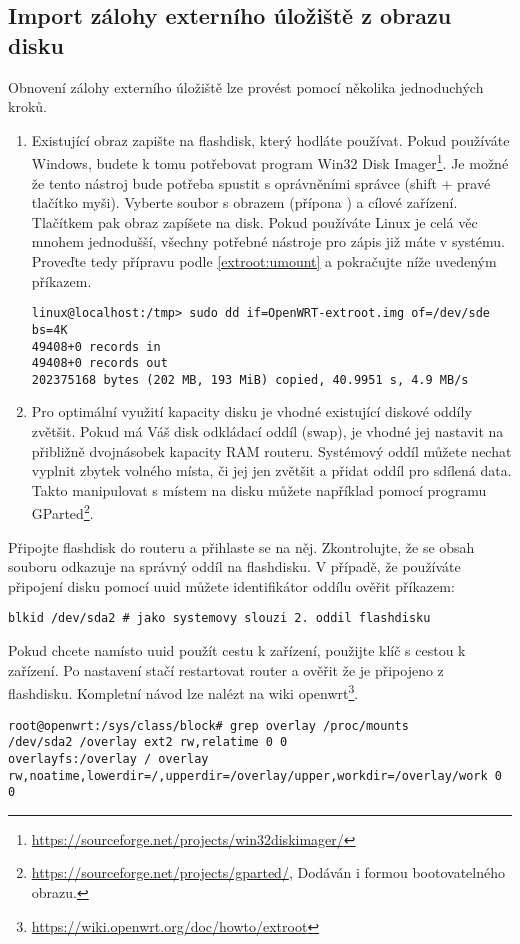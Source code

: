 \subsection{Import zálohy externího úložiště z obrazu disku}
Obnovení zálohy externího úložiště lze provést pomocí několika jednoduchých
kroků.
\begin{enumerate}
\item Existující obraz zapište na flashdisk, který hodláte používat.
Pokud používáte Windows, budete k tomu potřebovat program Win32 Disk
Imager\footnote{\url{https://sourceforge.net/projects/win32diskimager/}}.
Je možné že tento nástroj bude potřeba spustit s oprávněními správce
(shift + pravé tlačítko myši). Vyberte soubor s obrazem (přípona )
a cílové zařízení. Tlačítkem  pak obraz zapíšete na disk. Pokud
používáte Linux je celá věc mnohem jednodušší, všechny potřebné nástroje
pro zápis již máte v systému. Proveďte tedy přípravu podle \ref{extroot:umount}
a pokračujte níže uvedeným příkazem.
\begin{verbatim}
linux@localhost:/tmp> sudo dd if=OpenWRT-extroot.img of=/dev/sde bs=4K
49408+0 records in
49408+0 records out
202375168 bytes (202 MB, 193 MiB) copied, 40.9951 s, 4.9 MB/s
\end{verbatim}
\item Pro optimální využití kapacity disku je vhodné existující diskové
oddíly zvětšit. Pokud má Váš disk odkládací oddíl (swap), je vhodné jej
nastavit na přibližně dvojnásobek kapacity RAM routeru. Systémový oddíl
můžete nechat vyplnit zbytek volného místa, či jej jen zvětšit a přidat
oddíl pro sdílená data. Takto manipulovat s místem na disku můžete například
pomocí programu GParted\footnote{\url{https://sourceforge.net/projects/gparted/},
Dodáván i formou bootovatelného obrazu.}.
\end{enumerate}

Připojte flashdisk do routeru a přihlaste se na něj. Zkontrolujte, že se
obsah souboru  odkazuje na správný oddíl na flashdisku.
V případě, že používáte připojení disku pomocí \gls{uuid} můžete identifikátor
oddílu ověřit příkazem:
\begin{verbatim}
blkid /dev/sda2 # jako systemovy slouzi 2. oddil flashdisku
\end{verbatim}
Pokud chcete namísto \gls{uuid} použít cestu k zařízení, použijte klíč
 s cestou k zařízení. Po nastavení stačí restartovat router a
ověřit že je  připojeno z flashdisku. Kompletní návod lze
nalézt na wiki \gls{openwrt}\footnote{\url{https://wiki.openwrt.org/doc/howto/extroot}}.
\begin{verbatim}
root@openwrt:/sys/class/block# grep overlay /proc/mounts
/dev/sda2 /overlay ext2 rw,relatime 0 0
overlayfs:/overlay / overlay rw,noatime,lowerdir=/,upperdir=/overlay/upper,workdir=/overlay/work 0 0
\end{verbatim}
